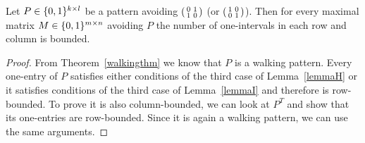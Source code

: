 \begin{lemma}
\label{lemmaWalkPat}
Let $P\in\{0,1\}^{k\times l}$ be a pattern avoiding $\left(\begin{smallmatrix}0&1\\1&0\end{smallmatrix}\right)$ (or $\left(\begin{smallmatrix}1&0\\0&1\end{smallmatrix}\right)$). Then for every maximal matrix $M\in\{0,1\}^{m\times n}$ avoiding $P$ the number of one-intervals in each row and column is bounded.
\end{lemma}
\begin{proof}
From Theorem~\ref{walkingthm} we know that $P$ is a walking pattern. Every one-entry of $P$ satisfies either conditions of the third case of Lemma~\ref{lemmaH} or it satisfies conditions of the third case of Lemma~\ref{lemmaI} and therefore is row-bounded. To prove it is also column-bounded, we can look at $P^T$ and show that its one-entries are row-bounded. Since it is again a walking pattern, we can use the same arguments.
\end{proof}


